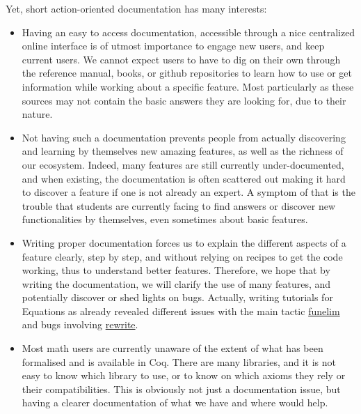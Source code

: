 \documentclass{easychair}
\begin{document}
Yet, short action-oriented documentation has many interests:
\begin{itemize}[itemsep=0pt]
  \item Having an easy to access documentation, accessible through a nice
        centralized online interface is of utmost importance to engage new
        users, and keep current users.
        We cannot expect users to have to dig on their own through the
        reference manual, books, or github repositories to learn how to use or
        get information while working about a specific feature.
        Most particularly as these sources may not contain the basic answers
        they are looking for, due to their nature.
  \item Not having such a documentation prevents people from actually
        discovering and learning by themselves new amazing features, as well as
        the richness of our ecosystem.
        Indeed, many features are still currently under-documented, and
        when existing, the documentation is often scattered out making it hard
        to discover a feature if one is not already an expert.
        A symptom of that is the trouble that students are currently facing to
        find answers or discover new functionalities by themselves, even sometimes
        about basic features.
  \item Writing proper documentation forces us to explain the different aspects
        of a feature clearly, step by step, and without relying on recipes to
        get the code working, thus to understand better features.
        Therefore, we hope that by writing the documentation, we will clarify
        the use of many features, and potentially discover or shed lights on bugs.
        Actually, writing tutorials for Equations as already revealed different
        issues with the main tactic \href{https://github.com/Zimmi48/platform-docs/pull/1}{funelim}
        and bugs involving \href{https://coq.zulipchat.com/#narrow/stream/237659-Equations-devs-.26-users/topic/Bug.20funelim.20on.20Ack}{rewrite}.
  \item Most math users are currently unaware of the extent of what has been
        formalised and is available in Coq.
        There are many libraries, and it is not easy to know which library to
        use, or to know on which axioms they rely or their compatibilities.
        This is obviously not just a documentation issue, but having a clearer
        documentation of what we have and where would help.
\end{itemize}
\end{document}
